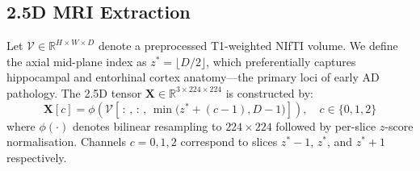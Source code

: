 \documentclass[conference]{IEEEtran}
\begin{document}
\subsection{2.5D MRI Extraction}
\label{sec:25d}

Let $\mathcal{V} \in \mathbb{R}^{H \times W \times D}$ denote
a preprocessed T1-weighted NIfTI volume. We define the axial
mid-plane index as $z^* = \lfloor D/2 \rfloor$, which
preferentially captures hippocampal and entorhinal cortex
anatomy---the primary loci of early AD pathology. The 2.5D
tensor $\mathbf{X} \in \mathbb{R}^{3 \times 224 \times 224}$
is constructed by:
\begin{equation}
\mathbf{X}[c] = \phi\!\left(\mathcal{V}[\,:\,,\,:\,,\,
  \min\!\bigl(z^*+(c-1),D{-}1\bigr)]\right),
  \quad c \in \{0,1,2\}
\label{eq:25d}
\end{equation}
where $\phi(\cdot)$ denotes bilinear resampling to
$224\!\times\!224$ followed by per-slice $z$-score
normalisation. Channels $c=0,1,2$ correspond to slices
$z^*{-}1$, $z^*$, and $z^*{+}1$ respectively.
\end{document}
